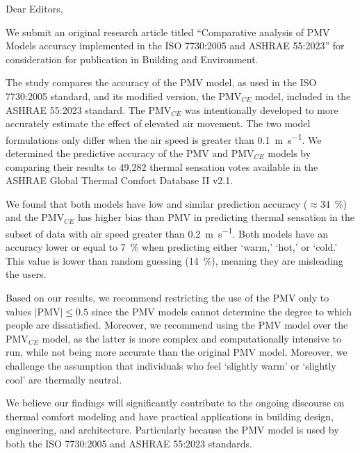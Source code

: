 \documentclass[11pt,a4paper,roman]{moderncv}        %
\begin{document}
\date{\today}
\opening{Dear Editors,}

\makelettertitle

We submit an original research article titled ``Comparative analysis of PMV Models accuracy implemented in the ISO 7730:2005 and ASHRAE 55:2023'' for consideration for publication in Building and Environment.

The study compares the accuracy of the PMV model, as used in the ISO 7730:2005 standard, and its modified version, the PMV$_{CE}$ model, included in the ASHRAE 55:2023 standard.
The PMV$_{CE}$ was intentionally developed to more accurately estimate the effect of elevated air movement.
The two model formulations only differ when the air speed is greater than \qty{0.1}{\m\per\s}.
We determined the predictive accuracy of the PMV and PMV$_{CE}$ models by comparing their results to 49,282 thermal sensation votes available in the ASHRAE Global Thermal Comfort Database II v2.1.

We found that both models have low and similar prediction accuracy ($ \approx$\qty{34}{\percent}) and the PMV$_{CE}$ has higher bias than PMV in predicting thermal sensation in the subset of data with air speed greater than \qty{0.2}{\m\per\s}.
Both models have an accuracy lower or equal to \qty{7}{\percent} when predicting either `warm,' `hot,' or `cold.'
This value is lower than random guessing (\qty{14}{\percent}), meaning they are misleading the users.

Based on our results, we recommend restricting the use of the PMV only to values $\lvert \textrm{PMV} \lvert \leq 0.5$ since the PMV models cannot determine the degree to which people are dissatisfied.
Moreover, we recommend using the PMV model over the PMV$_{CE}$ model, as the latter is more complex and computationally intensive to run, while not being more accurate than the original PMV model.
Moreover, we challenge the assumption that individuals who feel `slightly warm' or `slightly cool' are thermally neutral.

We believe our findings will significantly contribute to the ongoing discourse on thermal comfort modeling and have practical applications in building design, engineering, and architecture.
Particularly because the PMV model is used by both the ISO 7730:2005 and ASHRAE 55:2023 standards.
\end{document}
